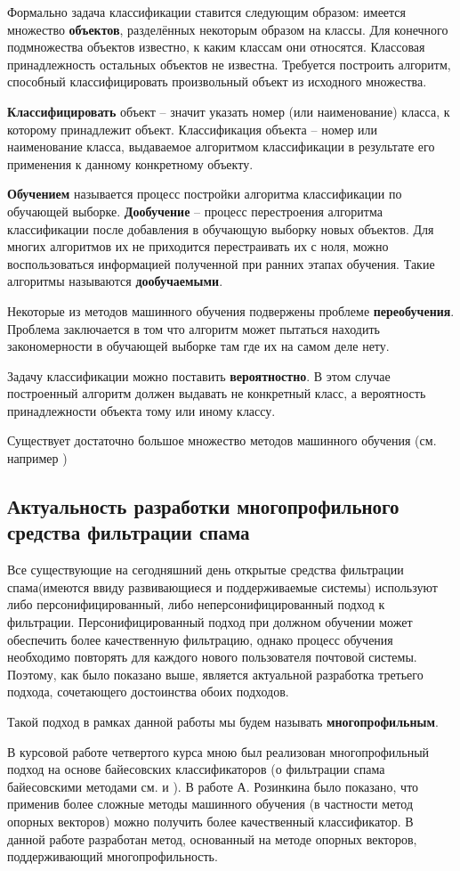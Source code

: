 Формально задача классификации ставится следующим образом: имеется множество \textbf{объектов}, разделённых некоторым образом на классы. Для конечного подмножества объектов известно, к каким классам они относятся. Классовая принадлежность остальных объектов не известна. Требуется построить алгоритм, способный классифицировать произвольный объект из исходного множества. 

\textbf{Классифицировать} объект – значит указать номер (или наименование) класса, к которому принадлежит объект. Классификация объекта – номер или  наименование класса, выдаваемое алгоритмом классификации в результате его применения к данному конкретному объекту.

\textbf{Обучением} называется процесс постройки алгоритма классификации по обучающей выборке. \textbf{Дообучение} – процесс перестроения алгоритма классификации после добавления в обучающую выборку новых объектов. Для многих алгоритмов их не приходится перестраивать их с ноля, можно воспользоваться информацией полученной при ранних этапах обучения. Такие алгоритмы называются \textbf{дообучаемыми}.

Некоторые из методов машинного обучения подвержены проблеме \textbf{переобучения}. Проблема заключается в том что алгоритм может пытаться находить закономерности в обучающей выборке там где их на самом деле нету.

Задачу классификации можно поставить \textbf{вероятностно}. В этом случае построенный  алгоритм должен выдавать не конкретный класс, а вероятность принадлежности объекта тому или иному классу.

Существует достаточно большое множество методов машинного обучения (см. например \cite{VORONCOV}) 

\subsection{Актуальность разработки многопрофильного средства фильтрации спама}

Все существующие на сегодняшний день открытые средства фильтрации спама(имеются ввиду развивающиеся и поддерживаемые системы) используют либо персонифицированный, либо неперсонифицированный подход к фильтрации. Персонифицированный подход при должном обучении может обеспечить более качественную фильтрацию, однако процесс обучения необходимо повторять для каждого нового пользователя почтовой системы. 
Поэтому, как было показано выше, является актуальной разработка третьего подхода, сочетающего достоинства обоих подходов. 

Такой подход в рамках данной работы мы будем называть \textbf{многопрофильным}. 

В курсовой работе четвертого курса \cite{PETROV10} мною был реализован многопрофильный подход на основе байесовских классификаторов (о фильтрации спама байесовскими методами см. \cite{PLANFORSPAM} и \cite{ROBINSON}). В работе А. Розинкина\cite{ROZ} было показано, что применив более сложные методы машинного обучения (в частности метод опорных векторов) можно получить более качественный классификатор. В данной работе разработан метод, основанный на методе опорных векторов, поддерживающий многопрофильность.
